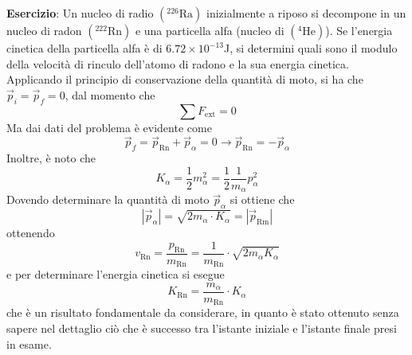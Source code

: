 \documentclass[a4paper]{extarticle}
\begin{document}
\vspace{1em}
\noindent
\textbf{Esercizio}: Un nucleo di radio $(^{226}\text{Ra})$ inizialmente a riposo si decompone in un nucleo di radon $(^{222}\text{Rn})$ e una particella alfa (nucleo di $(^{4}\text{He})$). Se l'energia cinetica della particella alfa è di $6.72 \times 10^{-13}$J, si determini quali sono il modulo della velocità di rinculo dell'atomo di radono e la sua energia cinetica.\\
Applicando il principio di conservazione della quantità di moto, si ha che $\vec p_i = \vec p_f=0$, dal momento che
\[\sum F_{\text{ext}}=0\]
Ma dai dati del problema è evidente come
\[\vec p_f=\vec p_{\text{Rn}} + \vec p_{\alpha}=0 \longrightarrow \vec p_{\text{Rn}} = - \vec p_\alpha\]
Inoltre, è noto che
\[K_\alpha = \frac{1}{2}m_\alpha^2=\frac{1}{2}\frac{1}{m_\alpha}p_\alpha^2\]
Dovendo determinare la quantità di moto $\vec p_\alpha$ si ottiene che
\[\left \vert \vec p_\alpha \right \vert = \sqrt{2 m_\alpha \cdot K_\alpha} = \left \vert \vec p_{\text{Rm}} \right \vert\]
ottenendo
\[v_{\text{Rn}}=\frac{p_{\text{Rn}}}{m_{\text{Rn}}} = \frac{1}{m_{\text{Rn}}} \cdot \sqrt{2 m_\alpha K_\alpha}\]
e per determinare l'energia cinetica si esegue
\[K_{\text{Rn}} = \frac{m_\alpha}{m_{\text{Rn}}} \cdot K_\alpha\]
che è un risultato fondamentale da considerare, in quanto è stato ottenuto senza sapere nel dettaglio ciò che è successo tra l'istante iniziale e l'istante finale presi in esame.
\end{document}

